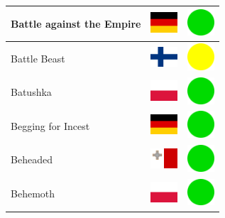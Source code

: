 \documentclass[12pt, a4paper, twoside]{report}
\begin{document}
\begin{center}
\begin{longtable}{|p{5cm}|p{2cm}|p{2cm}|}
Battle against the Empire & \includegraphics[width=1cm]{4x3/de} & \includegraphics[width=1cm]{likes/y} \\ \hline
Battle Beast & \includegraphics[width=1cm]{4x3/fi} & \includegraphics[width=1cm]{likes/m} \\ \hline
Batushka & \includegraphics[width=1cm]{4x3/pl} & \includegraphics[width=1cm]{likes/y} \\ \hline
Begging for Incest & \includegraphics[width=1cm]{4x3/de} & \includegraphics[width=1cm]{likes/y} \\ \hline
Beheaded & \includegraphics[width=1cm]{4x3/mt} & \includegraphics[width=1cm]{likes/y} \\ \hline
Behemoth & \includegraphics[width=1cm]{4x3/pl} & \includegraphics[width=1cm]{likes/y} \\ \hline

\end{longtable}
\end{center}
\end{document}
